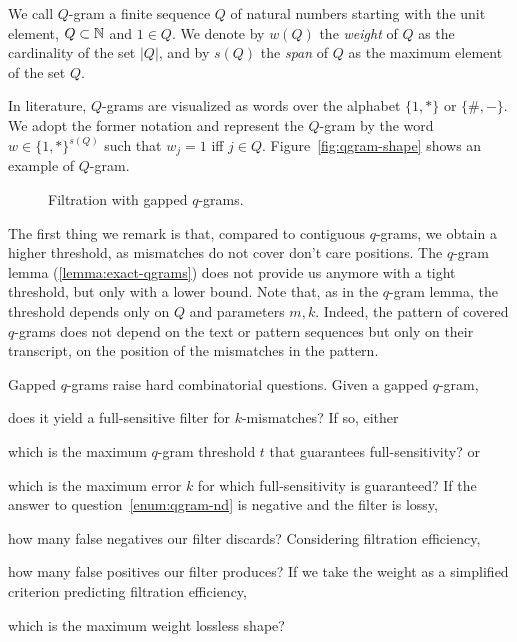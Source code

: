 \begin{definition}
We call $Q$-gram a finite sequence $Q$ of natural numbers starting with the unit element, \ie $Q \subset \mathbb {N}$ and $1 \in Q$.
We denote by $w(Q)$ the \emph{weight} of $Q$ as the cardinality of the set $|Q|$, and by $s(Q)$ the \emph{span} of $Q$ as the maximum element of the set $Q$.
\end{definition}

In literature, $Q$-grams are visualized as words over the alphabet $\{1,*\}$ or $\{\#,-\}$.
We adopt the former notation and represent the $Q$-gram by the word $w \in \{1,*\}^{s(Q)}$ such that $w_j=1$ iff $j \in Q$.
Figure~\ref{fig:qgram-shape} shows an example of $Q$-gram.

\begin{figure}[h]
\begin{center}
\caption[Filtration with gapped $q$-grams]{Filtration with gapped $q$-grams.}
\label{fig:qgrams-gapped}

\end{center}
\end{figure}

The first thing we remark is that, compared to contiguous $q$-grams, we obtain a higher threshold, as mismatches do not cover don't care positions.
The $q$-gram lemma (\ref{lemma:exact-qgrams}) does not provide us anymore with a tight threshold, but only with a lower bound.
Note that, as in the $q$-gram lemma, the threshold depends only on $Q$ and parameters $m,k$.
Indeed, the pattern of covered $q$-grams does not depend on the text or pattern sequences but only on their transcript, \ie on the position of the mismatches in the pattern.


Gapped $q$-grams raise hard combinatorial questions. Given a gapped $q$-gram, 
\begin{inparaenum}[(i)]
\item \label{enum:qgram-non-detection} does it yield a full-sensitive filter for $k$-mismatches? If so, either
\item \label{enum:qgram-threshold} which is the maximum $q$-gram threshold $t$ that guarantees full-sensitivity? or 
\item \label{enum:qgram-error} which is the maximum error $k$ for which full-sensitivity is guaranteed?
If the answer to question~\ref{enum:qgram-nd} is negative and the filter is lossy,
\item \label{enum:qgram-fn} how many false negatives our filter discards?
Considering filtration efficiency,
\item \label{enum:qgram-fp} how many false positives our filter produces?
If we take the weight as a simplified criterion predicting filtration efficiency, 
\item \label{enum:qgram-weight} which is the maximum weight lossless shape?
\end{inparaenum}

